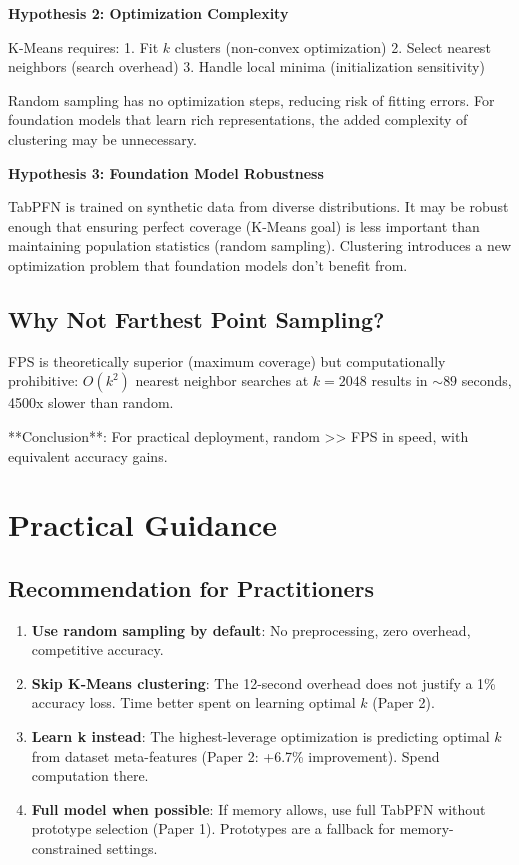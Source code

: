 \documentclass[11pt,a4paper]{article}
\begin{document}
\textbf{Hypothesis 2: Optimization Complexity}

K-Means requires:
1. Fit $k$ clusters (non-convex optimization)
2. Select nearest neighbors (search overhead)
3. Handle local minima (initialization sensitivity)

Random sampling has no optimization steps, reducing risk of fitting errors. For foundation models that learn rich representations, the added complexity of clustering may be unnecessary.

\textbf{Hypothesis 3: Foundation Model Robustness}

TabPFN is trained on synthetic data from diverse distributions. It may be robust enough that ensuring perfect coverage (K-Means goal) is less important than maintaining population statistics (random sampling). Clustering introduces a new optimization problem that foundation models don't benefit from.

\subsection{Why Not Farthest Point Sampling?}

FPS is theoretically superior (maximum coverage) but computationally prohibitive: $O(k^2)$ nearest neighbor searches at $k=2048$ results in $\sim 89$ seconds, 4500x slower than random.

**Conclusion**: For practical deployment, random >> FPS in speed, with equivalent accuracy gains.

\section{Practical Guidance}

\subsection{Recommendation for Practitioners}

\begin{enumerate}
\item \textbf{Use random sampling by default}: No preprocessing, zero overhead, competitive accuracy.

\item \textbf{Skip K-Means clustering}: The 12-second overhead does not justify a 1\% accuracy loss. Time better spent on learning optimal $k$ (Paper 2).

\item \textbf{Learn k instead}: The highest-leverage optimization is predicting optimal $k$ from dataset meta-features (Paper 2: +6.7\% improvement). Spend computation there.

\item \textbf{Full model when possible}: If memory allows, use full TabPFN without prototype selection (Paper 1). Prototypes are a fallback for memory-constrained settings.
\end{enumerate}
\end{document}
